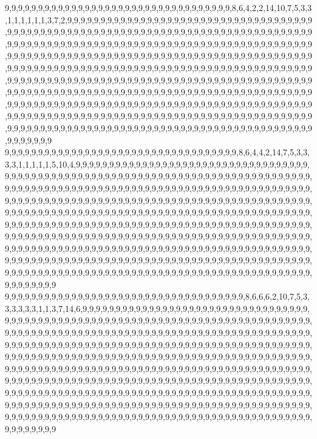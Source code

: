 9,9,9,9,9,9,9,9,9,9,9,9,9,9,9,9,9,9,9,9,9,9,9,9,9,9,9,9,9,9,9,9,9,9,8,6,4,2,2,14,10,7,5,3,3,1,1,1,1,1,1,3,7,2,9,9,9,9,9,9,9,9,9,9,9,9,9,9,9,9,9,9,9,9,9,9,9,9,9,9,9,9,9,9,9,9,9,9,9,9,9,9,9,9,9,9,9,9,9,9,9,9,9,9,9,9,9,9,9,9,9,9,9,9,9,9,9,9,9,9,9,9,9,9,9,9,9,9,9,9,9,9,9,9,9,9,9,9,9,9,9,9,9,9,9,9,9,9,9,9,9,9,9,9,9,9,9,9,9,9,9,9,9,9,9,9,9,9,9,9,9,9,9,9,9,9,9,9,9,9,9,9,9,9,9,9,9,9,9,9,9,9,9,9,9,9,9,9,9,9,9,9,9,9,9,9,9,9,9,9,9,9,9,9,9,9,9,9,9,9,9,9,9,9,9,9,9,9,9,9,9,9,9,9,9,9,9,9,9,9,9,9,9,9,9,9,9,9,9,9,9,9,9,9,9,9,9,9,9,9,9,9,9,9,9,9,9,9,9,9,9,9,9,9,9,9,9,9,9,9,9,9,9,9,9,9,9,9,9,9,9,9,9,9,9,9,9,9,9,9,9,9,9,9,9,9,9,9,9,9,9,9,9,9,9,9,9,9,9,9,9,9,9,9,9,9,9,9,9,9,9,9,9,9,9,9,9,9,9,9,9,9,9,9,9,9,9,9,9,9,9,9,9,9,9,9,9,9,9,9,9,9,9,9,9,9,9,9,9,9,9,9,9,9,9,9,9,9,9,9,9,9,9,9,9,9,9,9,9,9,9,9,9,9,9,9,9,9,9,9,9,9,9,9,9,9,9,9,9,9,9,9,9,9,9,9,9,9,9,9,9,9,9,9,9,9,9,9,9,9,9,9,9,9,9,9,9,9,9,9,9,9,9,9,9,9,9,9,9,9,9,9,9,9,9,9,9,9,9,9,9,9,9,9,9,9,9,9,9,9,9,9,9,9,9,9,9,9,9,9,9,9,9,9,9,9,9,9,9,9,9,9,9,9,9,9,9,9,9,9,9,9,9,9,9,9,9,9,9,9,9,9
9,9,9,9,9,9,9,9,9,9,9,9,9,9,9,9,9,9,9,9,9,9,9,9,9,9,9,9,9,9,9,9,9,9,9,8,6,4,4,2,14,7,5,3,3,3,3,1,1,1,1,1,5,10,4,9,9,9,9,9,9,9,9,9,9,9,9,9,9,9,9,9,9,9,9,9,9,9,9,9,9,9,9,9,9,9,9,9,9,9,9,9,9,9,9,9,9,9,9,9,9,9,9,9,9,9,9,9,9,9,9,9,9,9,9,9,9,9,9,9,9,9,9,9,9,9,9,9,9,9,9,9,9,9,9,9,9,9,9,9,9,9,9,9,9,9,9,9,9,9,9,9,9,9,9,9,9,9,9,9,9,9,9,9,9,9,9,9,9,9,9,9,9,9,9,9,9,9,9,9,9,9,9,9,9,9,9,9,9,9,9,9,9,9,9,9,9,9,9,9,9,9,9,9,9,9,9,9,9,9,9,9,9,9,9,9,9,9,9,9,9,9,9,9,9,9,9,9,9,9,9,9,9,9,9,9,9,9,9,9,9,9,9,9,9,9,9,9,9,9,9,9,9,9,9,9,9,9,9,9,9,9,9,9,9,9,9,9,9,9,9,9,9,9,9,9,9,9,9,9,9,9,9,9,9,9,9,9,9,9,9,9,9,9,9,9,9,9,9,9,9,9,9,9,9,9,9,9,9,9,9,9,9,9,9,9,9,9,9,9,9,9,9,9,9,9,9,9,9,9,9,9,9,9,9,9,9,9,9,9,9,9,9,9,9,9,9,9,9,9,9,9,9,9,9,9,9,9,9,9,9,9,9,9,9,9,9,9,9,9,9,9,9,9,9,9,9,9,9,9,9,9,9,9,9,9,9,9,9,9,9,9,9,9,9,9,9,9,9,9,9,9,9,9,9,9,9,9,9,9,9,9,9,9,9,9,9,9,9,9,9,9,9,9,9,9,9,9,9,9,9,9,9,9,9,9,9,9,9,9,9,9,9,9,9,9,9,9,9,9,9,9,9,9,9,9,9,9,9,9,9,9,9,9,9,9,9,9,9,9,9,9,9,9,9,9,9,9,9,9,9,9,9,9,9,9,9,9,9,9,9,9,9,9,9,9,9,9,9,9,9,9,9,9,9,9,9,9,9,9,9,9
9,9,9,9,9,9,9,9,9,9,9,9,9,9,9,9,9,9,9,9,9,9,9,9,9,9,9,9,9,9,9,9,9,9,9,9,8,6,6,6,2,10,7,5,3,3,3,3,3,3,1,1,3,7,14,6,9,9,9,9,9,9,9,9,9,9,9,9,9,9,9,9,9,9,9,9,9,9,9,9,9,9,9,9,9,9,9,9,9,9,9,9,9,9,9,9,9,9,9,9,9,9,9,9,9,9,9,9,9,9,9,9,9,9,9,9,9,9,9,9,9,9,9,9,9,9,9,9,9,9,9,9,9,9,9,9,9,9,9,9,9,9,9,9,9,9,9,9,9,9,9,9,9,9,9,9,9,9,9,9,9,9,9,9,9,9,9,9,9,9,9,9,9,9,9,9,9,9,9,9,9,9,9,9,9,9,9,9,9,9,9,9,9,9,9,9,9,9,9,9,9,9,9,9,9,9,9,9,9,9,9,9,9,9,9,9,9,9,9,9,9,9,9,9,9,9,9,9,9,9,9,9,9,9,9,9,9,9,9,9,9,9,9,9,9,9,9,9,9,9,9,9,9,9,9,9,9,9,9,9,9,9,9,9,9,9,9,9,9,9,9,9,9,9,9,9,9,9,9,9,9,9,9,9,9,9,9,9,9,9,9,9,9,9,9,9,9,9,9,9,9,9,9,9,9,9,9,9,9,9,9,9,9,9,9,9,9,9,9,9,9,9,9,9,9,9,9,9,9,9,9,9,9,9,9,9,9,9,9,9,9,9,9,9,9,9,9,9,9,9,9,9,9,9,9,9,9,9,9,9,9,9,9,9,9,9,9,9,9,9,9,9,9,9,9,9,9,9,9,9,9,9,9,9,9,9,9,9,9,9,9,9,9,9,9,9,9,9,9,9,9,9,9,9,9,9,9,9,9,9,9,9,9,9,9,9,9,9,9,9,9,9,9,9,9,9,9,9,9,9,9,9,9,9,9,9,9,9,9,9,9,9,9,9,9,9,9,9,9,9,9,9,9,9,9,9,9,9,9,9,9,9,9,9,9,9,9,9,9,9,9,9,9,9,9,9,9,9,9,9,9,9,9,9,9,9,9,9,9,9,9,9,9,9,9,9,9,9,9,9,9,9,9,9,9,9,9,9,9,9,9,9
